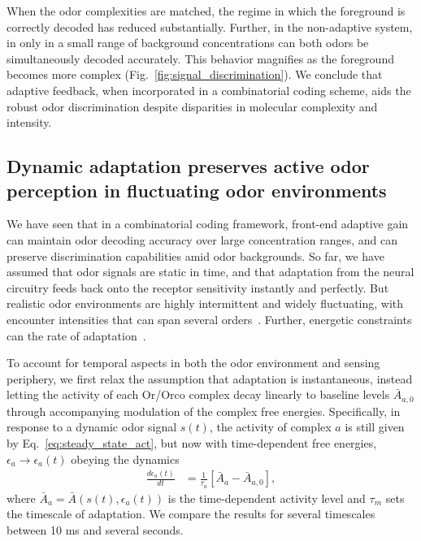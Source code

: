 When the odor complexities are matched, the regime in which the foreground is correctly decoded has reduced substantially. Further, in the non-adaptive system, in only in a small range of background concentrations can both odors be simultaneously decoded accurately. This behavior magnifies as the foreground becomes more complex (Fig.~\ref{fig:signal_discrimination}). We conclude that adaptive feedback, when incorporated in a combinatorial coding scheme, aids the robust odor discrimination despite disparities in molecular complexity and intensity. 






\subsection{Dynamic adaptation preserves active odor perception in fluctuating odor environments}
We have seen that in a combinatorial coding framework, front-end adaptive gain can maintain odor decoding accuracy over large concentration ranges, and can preserve discrimination capabilities amid odor backgrounds. So far, we have assumed that odor signals are static in time, and that adaptation from the neural circuitry feeds back onto the receptor sensitivity instantly and perfectly. But realistic odor environments are highly intermittent and widely fluctuating, with encounter intensities that can span several orders~\cite{celani}. Further, energetic constraints can the rate of adaptation~\cite{ESA}.

To account for temporal aspects in both the odor environment and sensing periphery, we first relax the assumption that adaptation is instantaneous, instead letting the activity of each Or/Orco complex decay linearly to baseline levels $\bar{A}_{a, 0}$ through accompanying modulation of the complex free energies. Specifically, in response to a dynamic odor signal $s(t)$, the activity of complex $a$ is still given by Eq.~\ref{eq:steady_state_act}, but now with time-dependent free energies, $\epsilon_a \rightarrow \epsilon_a(t)$ obeying the dynamics
\begin{align}
\frac{d\epsilon_a(t)}{dt} &= \frac{1}{\tau_a}\left[\bar{A}_a - \bar {A}_{a,0}\right],
\end{align}
where $\bar {A}_a = \bar{A}(s(t), \epsilon_a(t))$ is the time-dependent activity level and $\tau_m$ sets the timescale of adaptation. We compare the results for several timescales between 10 ms and several seconds.



